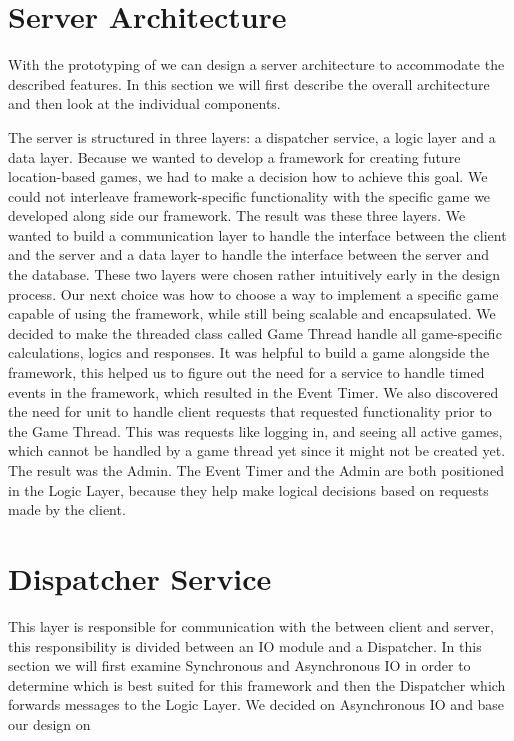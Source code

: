 \section{Server Architecture}
\label{sec:server}
With the prototyping of  we can design a server architecture to accommodate the described features. In this section we will first describe the overall architecture and then look at the individual components.

The server is structured in three layers: a dispatcher service, a logic layer and a data layer. Because we wanted to develop a framework for creating future location-based games, we had to make a decision how to achieve this goal. We could not interleave framework-specific functionality with the specific game we developed along side our framework. The result was these three layers. We wanted to build a communication layer to handle the interface between the client and the server and a data layer to handle the interface between the server and the database. These two layers were chosen rather intuitively early in the design process. Our next choice was how to choose a way to implement a specific game capable of using the framework, while still being scalable and encapsulated. We decided to make the threaded class called Game Thread handle all game-specific calculations, logics and responses. 
It was helpful to build a game alongside the framework, this helped us to figure out the need for a service to handle timed events in the framework, which resulted in the Event Timer. We also discovered the need for unit to handle client requests that requested functionality prior to the Game Thread. This was requests like logging in, and seeing all active games, which cannot be handled by a game thread yet since it might not be created yet. The result was the Admin. The Event Timer and the Admin are both positioned in the Logic Layer, because they help make logical decisions based on requests made by the client. 



\section{Dispatcher Service}
This layer is responsible for communication with the between client and server, this responsibility is divided between an IO module and a Dispatcher. In this section we will first examine Synchronous and Asynchronous IO in order to determine which is best suited for this framework and then the Dispatcher which forwards messages to the Logic Layer. We decided on Asynchronous IO and base our design on \cite{?} 	 %

